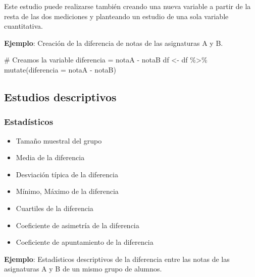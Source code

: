 \documentclass[
  spanish,
  a4paper,
]{scrreport}
\newenvironment{Shaded}{\begin{snugshade}}{\end{snugshade}}
\newcommand{\AttributeTok}[1]{\textcolor[rgb]{0.40,0.45,0.13}{#1}}
\newcommand{\CommentTok}[1]{\textcolor[rgb]{0.37,0.37,0.37}{#1}}
\newcommand{\FunctionTok}[1]{\textcolor[rgb]{0.28,0.35,0.67}{#1}}
\newcommand{\NormalTok}[1]{\textcolor[rgb]{0.00,0.23,0.31}{#1}}
\newcommand{\OtherTok}[1]{\textcolor[rgb]{0.00,0.23,0.31}{#1}}
\newcommand{\SpecialCharTok}[1]{\textcolor[rgb]{0.37,0.37,0.37}{#1}}
\providecommand{\tightlist}{%
  \setlength{\itemsep}{0pt}\setlength{\parskip}{0pt}}
\theoremstyle{definition}
\theoremstyle{definition}
\theoremstyle{remark}
\begin{document}
Este estudio puede realizarse también creando una nueva variable a
partir de la resta de las dos mediciones y planteando un estudio de una
sola variable cuantitativa.

\textbf{Ejemplo}: Creación de la diferencia de notas de las asignaturas
A y B.

\begin{Shaded}
\begin{Highlighting}[]
\CommentTok{\# Creamos la variable diferencia = notaA {-} notaB}
\NormalTok{df }\OtherTok{\textless{}{-}}\NormalTok{ df }\SpecialCharTok{\%\textgreater{}\%} \FunctionTok{mutate}\NormalTok{(}\AttributeTok{diferencia =}\NormalTok{ notaA }\SpecialCharTok{{-}}\NormalTok{ notaB)}
\end{Highlighting}
\end{Shaded}

\subsection{Estudios descriptivos}\label{estudios-descriptivos-3}

\subsubsection{Estadísticos}\label{estaduxedsticos-3}

\begin{itemize}
\tightlist
\item
  Tamaño muestral del grupo
\item
  Media de la diferencia
\item
  Desviación típica de la diferencia
\item
  Mínimo, Máximo de la diferencia
\item
  Cuartiles de la diferencia
\item
  Coeficiente de asimetría de la diferencia
\item
  Coeficiente de apuntamiento de la diferencia
\end{itemize}

\textbf{Ejemplo}: Estadísticos descriptivos de la diferencia entre las
notas de las asignaturas A y B de un mismo grupo de alumnos.

\begin{Shaded}
\end{Shaded}
\end{document}
